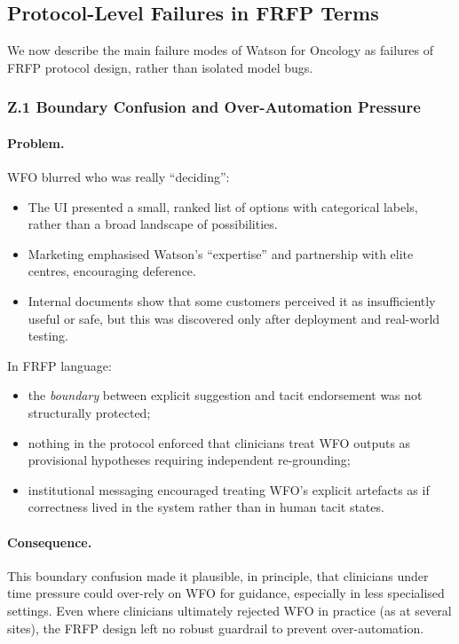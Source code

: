 \subsection{Protocol-Level Failures in FRFP Terms}

We now describe the main failure modes of Watson for Oncology as failures of
FRFP protocol design, rather than isolated model bugs.

\subsubsection*{Z.1 Boundary Confusion and Over-Automation Pressure}

\paragraph{Problem.}
WFO blurred who was really ``deciding'':

\begin{itemize}
  \item The UI presented a small, ranked list of options with categorical
        labels, rather than a broad landscape of possibilities.
  \item Marketing emphasised Watson’s ``expertise'' and partnership with elite
        centres, encouraging deference.
  \item Internal documents show that some customers perceived it as
        insufficiently useful or safe, but this was discovered only after
        deployment and real-world testing.
\end{itemize}

In FRFP language:

\begin{itemize}
  \item the \emph{boundary} between explicit suggestion and tacit endorsement
        was not structurally protected;
  \item nothing in the protocol enforced that clinicians treat WFO outputs
        as provisional hypotheses requiring independent re-grounding;
  \item institutional messaging encouraged treating WFO’s explicit artefacts
        as if correctness lived in the system rather than in human tacit
        states.
\end{itemize}

\paragraph{Consequence.}
This boundary confusion made it plausible, in principle, that clinicians
under time pressure could over-rely on WFO for guidance, especially in less
specialised settings.
Even where clinicians ultimately rejected WFO in practice (as at several
sites), the FRFP design left no robust guardrail to prevent over-automation.

